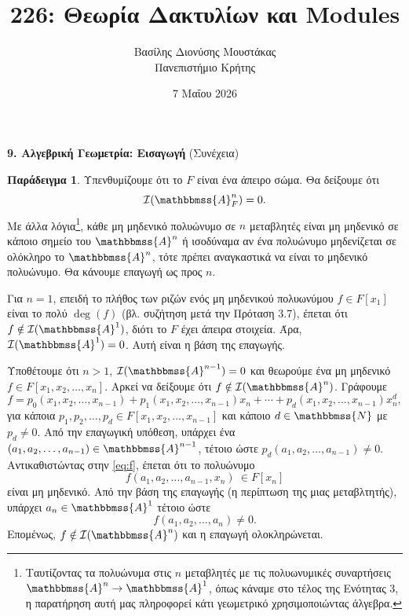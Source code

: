 \documentclass[12pt,a4paper,reqno]{amsart}
\title{226: Θεωρία Δακτυλίων και Modules}
\author[Β.~Δ. Μουστακας]{Βασίλης Διονύσης Μουστάκας \\ Πανεπιστήμιο Κρήτης}
\date{7 Μαΐου 2026}
\theoremstyle{definition}
\newtheorem{example}[theorem]{Παράδειγμα}
\theoremstyle{remark}
\numberwithin{theorem}{section}
\numberwithin{exercise}{section}
\numberwithin{equation}{section}
\renewcommand{\AA}{\mathbbmss{A}}
\newcommand{\NN}{\mathbbmss{N}}
\newcommand{\iI}{\mathcal{I}}
\renewcommand{\to}{\rightarrow}
\newcommand{\Pol}[1]{F[x_1, x_2, \dots, x_{#1}]}
\begin{document}
\begingroup
\def\uppercasenonmath#1{} %
\let\MakeUppercase\relax %
\maketitle
\endgroup

\setcounter{section}{9}
\setcounter{theorem}{6}
\setcounter{equation}{2}
\begin{center}
    \textbf{9. Αλγεβρική Γεωμετρία: Εισαγωγή
} (Συνέχεια)
\end{center}


\begin{example}
    \label{ex:vanishing_ideal_of_whole_variety}
    Υπενθυμίζουμε ότι το $F$ είναι ένα άπειρο σώμα. Θα δείξουμε ότι 
    \[
    \iI(\AA_F^n) = 0.
    \]
    Με άλλα λόγια\footnote{Ταυτίζοντας τα πολυώνυμα στις $n$ μεταβλητές με τις πολυωνυμικές συναρτήσεις $\AA^n \to \AA^1$, όπως κάναμε στο τέλος της Ενότητας 3, η παρατήρηση αυτή μας πληροφορεί κάτι γεωμετρικό χρησιμοποιώντας άλγεβρα.}, κάθε μη μηδενικό πολυώνυμο σε $n$ μεταβλητές είναι μη μηδενικό σε κάποιο σημείο του $\AA^n$ ή ισοδύναμα αν ένα πολυώνυμο μηδενίζεται σε ολόκληρο το $\AA^n$, τότε πρέπει αναγκαστικά να είναι το μηδενικό πολυώνυμο. Θα κάνουμε επαγωγή ως προς $n$. 

    Για $n=1$, επειδή το πλήθος των ριζών ενός μη μηδενικού πολυωνύμου $f \in F[x_1]$ είναι το πολύ $\deg(f)$ (βλ. συζήτηση μετά την Πρόταση 3.7), έπεται ότι $f \notin \iI(\AA^1)$, διότι το $F$ έχει άπειρα στοιχεία. Άρα, $\iI(\AA^1) = 0$. Αυτή είναι η βάση της επαγωγής. 
    
    Υποθέτουμε ότι $n > 1$, $\iI(\AA^{n-1}) = 0$ και θεωρούμε ένα μη μηδενικό $f \in \Pol{n}$. Αρκεί να δείξουμε ότι $f \notin \iI(\AA^n)$. Γράφουμε 
    \begin{equation}
        \label{eq:f}
        f = p_0(x_1,x_2,\dots, x_{n-1}) + p_1(x_1,x_2,\dots, x_{n-1}) x_n + \cdots + p_d(x_1,x_2,\dots, x_{n-1}) x_n^d,
    \end{equation}
    για κάποια $p_1, p_2, \dots, p_d \in \Pol{n-1}$ και κάποιο $d \in \NN$ με $p_d \neq 0$. Από την επαγωγική υπόθεση, υπάρχει ένα $(a_1, a_2, \dots, a_{n-1}) \in \AA^{n-1}$, τέτοιο ώστε $p_d(a_1, a_2, \dots, a_{n-1}) \neq 0$. Αντικαθιστώντας στην \eqref{eq:f}, έπεται ότι το πολυώνυμο
    \[
    f(a_1, a_2, \dots, a_{n-1}, x_n) \ \in F[x_n]
    \] 
    είναι μη μηδενικό. Από την βάση της επαγωγής (η περίπτωση της μιας μεταβλτητής), υπάρχει $a_n \in \AA^1$ τέτοιο ώστε 
    \[     
    f(a_1, a_2, \dots, a_n) \neq 0. 
    \]   
    Επομένως, $f \notin \iI(\AA^n)$ και η επαγωγή ολοκληρώνεται.
\end{example}
\end{document}
